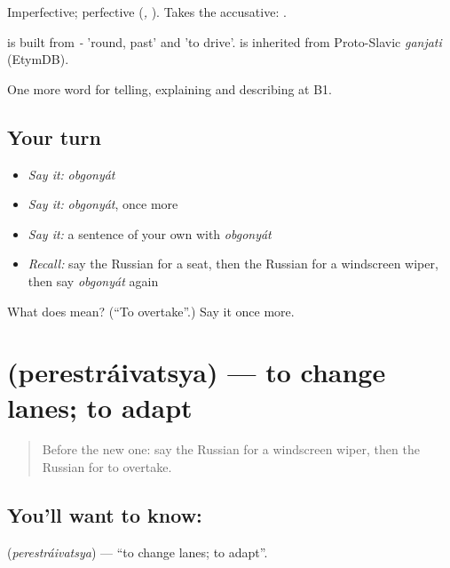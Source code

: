 Imperfective; perfective \emph{} (\emph{, }). Takes the accusative: \emph{ }.

\begin{cousinweb}
\emph{} is built from \emph{-} 'round, past' and \emph{} 'to drive'. \emph{} is inherited from Proto-Slavic \emph{ganjati} (EtymDB).
\end{cousinweb}

\begin{grammarlens}[title={What you've built}]
One more word for telling, explaining and describing at B1.
\end{grammarlens}

\subsection*{Your turn}
\begin{itemize}
\raggedright
  \item \emph{Say it:} \emph{obgonyát}
  \item \emph{Say it:} \emph{obgonyát}, once more
  \item \emph{Say it:} a sentence of your own with \emph{obgonyát}
  \item \emph{Recall:} say the Russian for a seat, then the Russian for a windscreen wiper, then say \emph{obgonyát} again
\end{itemize}

\begin{tcolorbox}[breakable,colback=teal!4,colframe=teal!35!black,title={Before you move on}]
What does  mean? (\textquotedblleft{}To overtake\textquotedblright{}.) Say it once more.
\end{tcolorbox}
\section[\texorpdfstring{\ru{перестраиваться} (perestráivatsya)}{перестраиваться (perestráivatsya)}]{ (perestráivatsya) — to change lanes; to adapt}

\label{lesson:RU-C407-perestraivatsya}



\begin{quote}
Before the new one: say the Russian for a windscreen wiper, then the Russian for to overtake.
\end{quote}

\subsection*{You'll want to know: }
\textbf{} (\emph{perestráivatsya}) — \textquotedblleft{}to change lanes; to adapt\textquotedblright{}.

